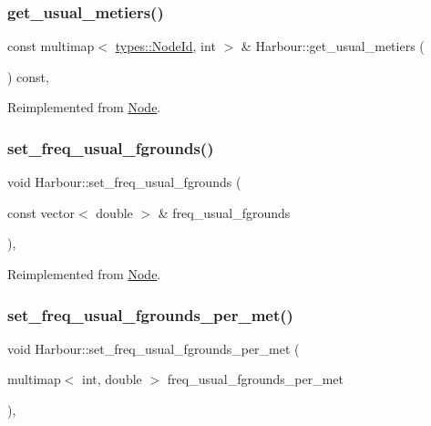 \subsubsection{\texorpdfstring{get\_usual\_metiers()}{get\_usual\_metiers()}}
{\footnotesize\ttfamily const multimap$<$ \mbox{\hyperlink{classtypes_1_1_node_id}{types\+::\+Node\+Id}}, int $>$ \& Harbour\+::get\+\_\+usual\+\_\+metiers (\begin{DoxyParamCaption}{ }\end{DoxyParamCaption}) const\hspace{0.3cm}{\ttfamily [override]}, {\ttfamily [virtual]}}



Reimplemented from \mbox{\hyperlink{class_node_aab0fed01a893726033107dd46ccadcb8}{Node}}.

\mbox{\label{class_harbour_ab64450e0c491deb6ac7927c27b9e45d6}} 
\subsubsection{\texorpdfstring{set\_freq\_usual\_fgrounds()}{set\_freq\_usual\_fgrounds()}}
{\footnotesize\ttfamily void Harbour\+::set\+\_\+freq\+\_\+usual\+\_\+fgrounds (\begin{DoxyParamCaption}\item[{const vector$<$ double $>$ \&}]{freq\+\_\+usual\+\_\+fgrounds }\end{DoxyParamCaption})\hspace{0.3cm}{\ttfamily [override]}, {\ttfamily [virtual]}}



Reimplemented from \mbox{\hyperlink{class_node_a89f4c8cc73721328fb2148136b713fd0}{Node}}.

\mbox{\label{class_harbour_a2cdc3a58a3a649f0ba6eed57ca977701}} 
\subsubsection{\texorpdfstring{set\_freq\_usual\_fgrounds\_per\_met()}{set\_freq\_usual\_fgrounds\_per\_met()}}
{\footnotesize\ttfamily void Harbour\+::set\+\_\+freq\+\_\+usual\+\_\+fgrounds\+\_\+per\+\_\+met (\begin{DoxyParamCaption}\item[{multimap$<$ int, double $>$}]{freq\+\_\+usual\+\_\+fgrounds\+\_\+per\+\_\+met }\end{DoxyParamCaption})\hspace{0.3cm}{\ttfamily [override]}, {\ttfamily [virtual]}}




